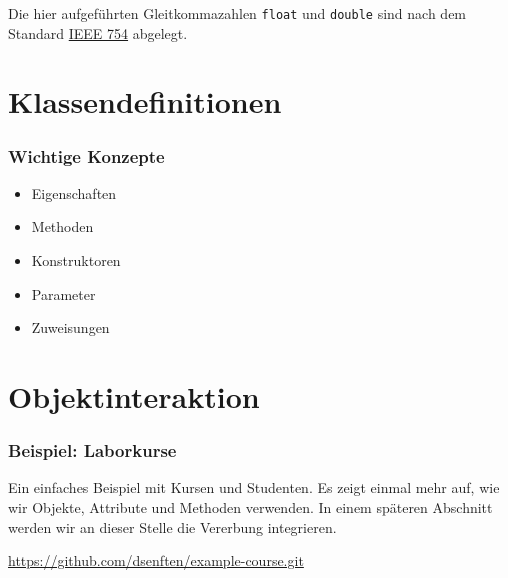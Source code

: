 Die hier aufgeführten Gleitkommazahlen \texttt{float} und \texttt{double} sind
nach dem Standard \href{https://de.wikipedia.org/wiki/IEEE_754}{IEEE 754} abgelegt.



\section{Klassendefinitionen}
\label{sec:class-definitions}

\begin{frame}[fragile]
    \frametitle<presentation>{Wichtige Konzepte}

    \begin{itemize}
        \item Eigenschaften
        \item Methoden
        \item Konstruktoren
        \item Parameter
        \item Zuweisungen
    \end{itemize}

\end{frame}



\section{Objektinteraktion}
\label{sec:interaction}


\begin{frame}[fragile]
    \frametitle<presentation>{Beispiel: Laborkurse}
    Ein einfaches Beispiel mit Kursen und Studenten. Es zeigt einmal mehr auf, wie wir
    Objekte, Attribute und Methoden verwenden. In einem späteren Abschnitt werden wir
    an dieser Stelle die Vererbung integrieren.

    \href{https://github.com/dsenften/example-course.git}
         {https://github.com/dsenften/example-course.git}

\end{frame}

